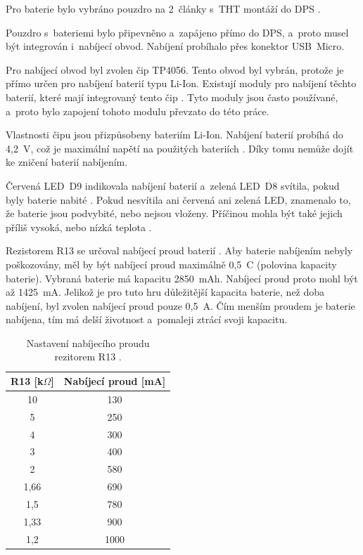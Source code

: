   Pro baterie bylo vybráno pouzdro na 2~články s~THT montáží do DPS \cite{18650_pouzdro}.

  Pouzdro s~bateriemi bylo připevněno a~zapájeno přímo do DPS, a~proto musel být integrován i~nabíjecí obvod. Nabíjení probíhalo přes konektor 
  USB~Micro.

  Pro nabíjecí obvod byl zvolen čip TP4056. Tento obvod byl vybrán, protože je přímo určen pro nabíjení baterií typu Li-Ion. Existují 
  moduly pro nabíjení těchto baterií, které mají integrovaný tento čip \cite{Nabijeci_modul}. Tyto moduly jsou často používané, a~proto 
  bylo zapojení tohoto modulu převzato do této práce. 

  Vlastnosti čipu jsou přizpůsobeny bateriím Li-Ion. Nabíjení baterií probíhá do 4,2~V, což je maximální napětí na použitých 
  bateriích \cite{18650} \cite{TP4056_datasheet}. Díky tomu nemůže dojít ke zničení baterií nabíjením.

  Červená LED~D9 indikovala nabíjení baterií a~zelená LED~D8 svítila, pokud byly baterie nabité \cite{TP4056_datasheet}. 
  Pokud nesvítila ani červená ani zelená LED, znamenalo to, že baterie jsou podvybité, nebo nejsou vloženy. Příčinou mohla být také jejich příliš 
  vysoká, nebo nízká teplota \cite{TP4056_datasheet}.

  Rezistorem R13 se určoval nabíjecí proud baterií \cite{TP4056_datasheet}. Aby baterie nabíjením nebyly poškozovány, měl by být nabíjecí 
  proud maximálně 0,5~C (polovina kapacity baterie). Vybraná baterie má kapacitu 2850~mAh. Nabíjecí proud proto mohl být až 1425~mA. 
  Jelikož je pro tuto hru důležitější kapacita baterie, než doba nabíjení, byl zvolen nabíjecí proud pouze 0,5~A. Čím menším proudem 
  je baterie nabíjena, tím má delší životnost a~pomaleji ztrácí svoji kapacitu.

  \begin{table}[!h]
    \caption{Nastavení nabíjecího proudu rezitorem R13 \cite{TP4056_datasheet}.}
    \begin{center}
      \begin{tabular}{|c|c|}
          \hline
          R13 [k$\Omega$] & Nabíjecí proud [mA] \\
          \hline
          10      & 130 \\
          \hline
          5       & 250 \\
          \hline
          4       & 300 \\
          \hline
          3       & 400 \\
          \hline
          2       & 580 \\
          \hline
          1,66    & 690 \\
          \hline
          1,5     & 780 \\
          \hline
          1,33    & 900 \\
          \hline
          1,2     & 1000 \\
          \hline
      \end{tabular}  
    \end{center}
  \end{table}

